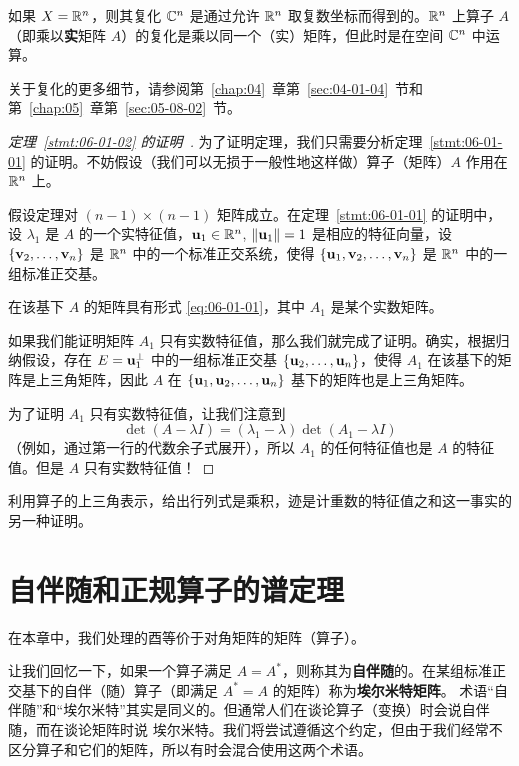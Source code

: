 如果 $X = \mathbb{R}^n$，则其复化 $\mathbb{C}^n$ 是通过允许 $\mathbb{R}^n$ 取复数坐标而得到的。$\mathbb{R}^n$ 上算子 $A$（即乘以\textbf{实}矩阵 $A$）的复化是乘以同一个（实）矩阵，但此时是在空间 $\mathbb{C}^n$ 中运算。

关于复化的更多细节，请参阅第~\ref{chap:04}~章第~\ref{sec:04-01-04}~节和第~\ref{chap:05}~章第~\ref{sec:05-08-02}~节。

\begin{proof}[\normalfont\heiti 定理~\ref{stmt:06-01-02} 的证明~\nopunct]为了证明定理，我们只需要分析定理~\ref{stmt:06-01-01} 的证明。不妨假设（我们可以无损于一般性地这样做）算子（矩阵）$A$ 作用在 $\mathbb{R}^n$ 上。

假设定理对 $(n-1) \times (n-1)$ 矩阵成立。在定理~\ref{stmt:06-01-01} 的证明中，设 $\lambda_1$ 是 $A$ 的一个实特征值，$\mathbf{u}_1 \in \mathbb{R}^n$, $\|\mathbf{u}_1\| = 1$ 是相应的特征向量，设 $\{\mathbf{v}_2, \dots, \mathbf{v}_n\}$ 是 $\mathbb{R}^n$ 中的一个标准正交系统，使得 $\{\mathbf{u}_1, \mathbf{v}_2, \dots, \mathbf{v}_n\}$ 是 $\mathbb{R}^n$ 中的一组标准正交基。

在该基下 $A$ 的矩阵具有形式 \eqref{eq:06-01-01}，其中 $A_1$ 是某个实数矩阵。

如果我们能证明矩阵 $A_1$ 只有实数特征值，那么我们就完成了证明。确实，根据归纳假设，存在 $E = \mathbf{u}_1^\perp$ 中的一组标准正交基 $\{\mathbf{u}_2, \dots, \mathbf{u}_n\}$，使得 $A_1$ 在该基下的矩阵是上三角矩阵，因此 $A$ 在 $\{\mathbf{u}_1, \mathbf{u}_2, \dots, \mathbf{u}_n\}$ 基下的矩阵也是上三角矩阵。

为了证明 $A_1$ 只有实数特征值，让我们注意到
$$\det(A - \lambda I) = ( \lambda_1 - \lambda ) \det( A_1 - \lambda I )$$
（例如，通过第一行的代数余子式展开），所以 $A_1$ 的任何特征值也是 $A$ 的特征值。但是 $A$ 只有实数特征值！\end{proof}

\begin{problemset}
\item \label{ex:06-01-01} 利用算子的上三角表示，给出行列式是乘积，迹是计重数的特征值之和这一事实的另一种证明。
\end{problemset}

\section{自伴随和正规算子的谱定理}\label{sec:06-02}

在本章中，我们处理的酉等价于对角矩阵的矩阵（算子）。

让我们回忆一下，如果一个算子满足 $A = A^*$，则称其为\textbf{自伴随}的。在某组标准正交基下的自伴（随）算子（即满足 $A^* = A$ 的矩阵）称为\textbf{埃尔米特矩阵}。
术语“自伴随”和“埃尔米特”其实是同义的。但通常人们在谈论算子（变换）时会说自伴随，而在谈论矩阵时说 埃尔米特。我们将尝试遵循这个约定，但由于我们经常不区分算子和它们的矩阵，所以有时会混合使用这两个术语。

